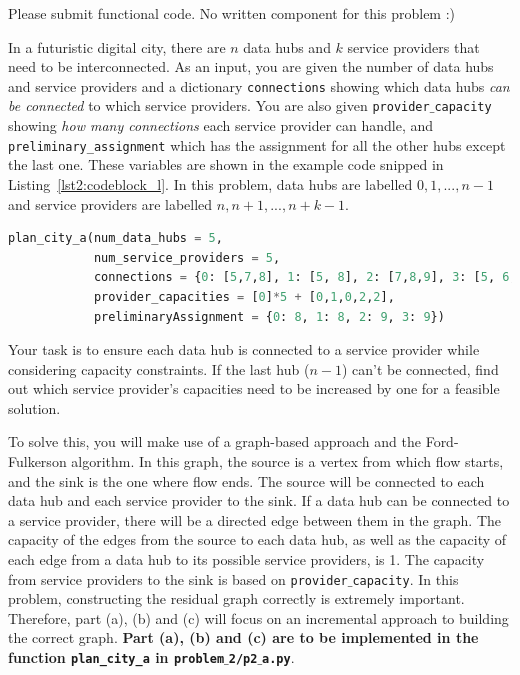 \documentclass{hw}
\begin{document}
\begin{solution}
Please submit functional code. No written component for this problem :)
\end{solution}

\newpage


\begin{problem}
In a futuristic digital city, there are $n$ data hubs and $k$ service providers that need to be interconnected. As an input, you are given the number of data hubs and service providers and a dictionary \texttt{connections} showing which data hubs \textit{can be connected} to which service providers. You are also given \texttt{provider$\_$capacity} showing \textit{how many connections} each service provider can handle, and \texttt{preliminary\_assignment} which has the assignment for all the other hubs except the last one. These variables are shown in the example code snipped in Listing~\ref{lst2:codeblock_l}. In this problem, data hubs are labelled $0, 1,..., n-1$ and service providers are labelled $n, n+1,..., n+k-1$.
\\
\begin{lstlisting}[language=Python,caption={The python function call to be made to generate the graphs for Problems 2.a,b,c.},label={lst2:codeblock_l},captionpos=b]
plan_city_a(num_data_hubs = 5,
            num_service_providers = 5,
            connections = {0: [5,7,8], 1: [5, 8], 2: [7,8,9], 3: [5, 6, 8, 9], 4: [5,6,7,8]},
            provider_capacities = [0]*5 + [0,1,0,2,2],
            preliminaryAssignment = {0: 8, 1: 8, 2: 9, 3: 9})
\end{lstlisting}

Your task is to ensure each data hub is connected to a service provider while considering capacity constraints. If the last hub ($n-1$) can't be connected, find out which service provider's capacities need to be increased by one for a feasible solution.

To solve this, you will make use of a graph-based approach and the Ford-Fulkerson algorithm. In this graph, the source is a vertex from which flow starts, and the sink is the one where flow ends. The source will be connected to each data hub and each service provider to the sink. If a data hub can be connected to a service provider, there will be a directed edge between them in the graph. The capacity of the edges from the source to each data hub, as well as the capacity of each edge from a data hub to its possible service providers, is 1. The capacity from service providers to the sink is based on \texttt{provider$\_$capacity}. In this problem, constructing the residual graph correctly is extremely important. Therefore, part (a), (b) and (c) will focus on an incremental approach to building the correct graph. \textbf{Part (a), (b) and (c) are to be implemented in the function \texttt{plan\_city\_a} in \texttt{problem$\_$2/p2$\_$a.py}}. 


\end{problem}
\end{document}
